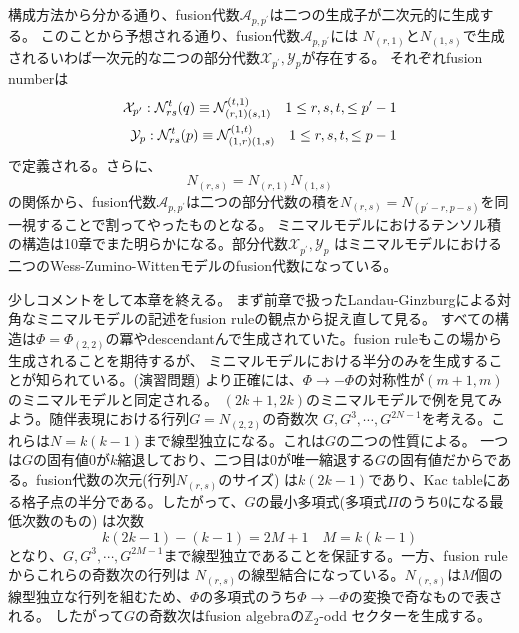 \documentclass[11pt, aps, longbibliography]{article}
\numberwithin{equation}{section}
\begin{document}
        構成方法から分かる通り、fusion代数$\mathcal{A}_{p,p^\prime}$は二つの生成子が二次元的に生成する。
        このことから予想される通り、fusion代数$\mathcal{A}_{p,p^\prime}$には
        $N_{(r,1)}$と$N_{(1,s)}$で生成されるいわば一次元的な二つの部分代数$\mathcal{X}_{p^\prime},\mathcal{Y}_p$が存在する。
        それぞれfusion numberは
        \begin{align}\label{eq:fusion3-31}
            \mathcal{X}_{p^\prime} : \mathcal{N}_{rs}^t(q) \equiv \mathcal{N}_{(r,1)(s,1)}^{(t,1)} \quad 1\leq r,s,t,\leq p^\prime-1 \\
            \mathcal{Y}_{p} : \mathcal{N}_{rs}^t(p) \equiv \mathcal{N}_{(1,r)(1,s)}^{(1,t)} \quad 1\leq r,s,t,\leq p-1 \notag
        \end{align}
        で定義される。さらに、
        \begin{equation}\label{eq:fusion3-32}
            N_{(r,s)} = N_{(r,1)}N_{(1,s)}
        \end{equation}
        の関係から、fusion代数$\mathcal{A}_{p,p^\prime}$は二つの部分代数の積を$N_{(r,s)}=N_{(p^\prime-r,p-s)}$を同一視することで割ってやったものとなる。
        ミニマルモデルにおけるテンソル積の構造は10章でまた明らかになる。部分代数$\mathcal{X}_{p^\prime},\mathcal{Y}_p$
        はミニマルモデルにおける二つのWess-Zumino-Wittenモデルのfusion代数になっている。

        少しコメントをして本章を終える。
        まず前章で扱ったLandau-Ginzburgによる対角なミニマルモデルの記述をfusion ruleの観点から捉え直して見る。
        すべての構造は$\Phi = \Phi_{(2,2)}$の冪やdescendantんで生成されていた。fusion ruleもこの場から生成されることを期待するが、
        ミニマルモデルにおける半分のみを生成することが知られている。(演習問題)
        より正確には、$\Phi \rightarrow -\Phi$の対称性が$(m+1,m)$のミニマルモデルと同定される。
        $(2k+1,2k)$のミニマルモデルで例を見てみよう。随伴表現における行列$G=N_{(2,2)}$の奇数次
        $G,G^3,\cdots,G^{2N-1}$を考える。これらは$N=k(k-1)$まで線型独立になる。これは$G$の二つの性質による。
        一つは$G$の固有値0が$k$縮退しており、二つ目は0が唯一縮退する$G$の固有値だからである。fusion代数の次元(行列$N_{(r,s)}$のサイズ)
        は$k(2k-1)$であり、Kac tableにある格子点の半分である。したがって、$G$の最小多項式(多項式$\Pi$のうち0になる最低次数のもの)
        は次数
        \begin{equation}\label{eq:fusion3-33}
            k(2k-1)-(k-1) = 2M+1 \quad M = k(k-1)
        \end{equation}
        となり、$G,G^3,\cdots,G^{2M-1}$まで線型独立であることを保証する。一方、fusion ruleからこれらの奇数次の行列は
        $N_{(r,s)}$の線型結合になっている。$N_{(r,s)}$は$M$個の線型独立な行列を組むため、$\Phi$の多項式のうち$\Phi\rightarrow -\Phi$の変換で奇なもので表される。
        したがって$G$の奇数次はfusion algebraの$\mathbb{Z}_2$-odd セクターを生成する。
\end{document}
